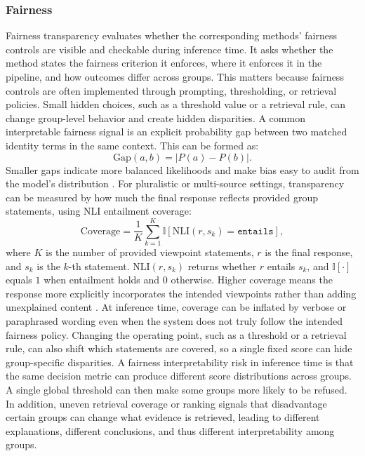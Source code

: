 \subsubsection{Fairness}
Fairness transparency evaluates whether the corresponding methods' fairness controls are visible and checkable during inference time. It asks whether the method states the fairness criterion it enforces, where it enforces it in the pipeline, and how outcomes differ across groups. This matters because fairness controls are often implemented through prompting, thresholding, or retrieval policies. Small hidden choices, such as a threshold value or a retrieval rule, can change group-level behavior and create hidden disparities. A common interpretable fairness signal is an explicit probability gap between two matched identity terms in the same context. This can be formed as:
\[
\mathrm{Gap}(a,b)=\big|P(a)-P(b)\big|.
\]
Smaller gaps indicate more balanced likelihoods and make bias easy to audit from the model's distribution \citep{cai2024locating}. For pluralistic or multi-source settings, transparency can be measured by how much the final response reflects provided group statements, using NLI entailment coverage:
\[
\mathrm{Coverage}=\frac{1}{K}\sum_{k=1}^{K}\mathbb{I}\!\left[\mathrm{NLI}(r, s_k)=\texttt{entails}\right],
\]
where $K$ is the number of provided viewpoint statements, $r$ is the final response, and $s_k$ is the $k$-th statement.
$\mathrm{NLI}(r,s_k)$ returns whether $r$ entails $s_k$, and $\mathbb{I}[\cdot]$ equals $1$ when entailment holds and $0$ otherwise. Higher coverage means the response more explicitly incorporates the intended viewpoints rather than adding unexplained content \citep{DBLP:conf/emnlp/FengSLFP0T24}. At inference time, coverage can be inflated by verbose or paraphrased wording even when the system does not truly follow the intended fairness policy.    
Changing the operating point, such as a threshold or a retrieval rule, can also shift which statements are covered, so a single fixed score can hide group-specific disparities. A fairness interpretability risk in inference time is that the same decision metric can produce different score distributions across groups. A single global threshold can then make some groups more likely to be refused. In addition, uneven retrieval coverage or ranking signals that disadvantage certain groups can change what evidence is retrieved, leading to different explanations, different conclusions, and thus different interpretability among groups.

